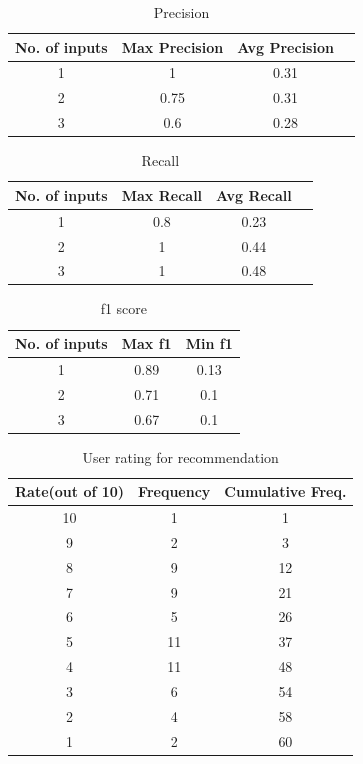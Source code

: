 \begin{table}
\centering
\caption{Precision}
\begin{tabular}{|c|c|c|c|}
\hline
No. of inputs & Max Precision & Avg Precision\\
\hline\hline
1 & 1 & 0.31\\
2 & 0.75 & 0.31\\
3 & 0.6 & 0.28\\
\hline\end{tabular}
\label{table:precision}
\end{table}

\begin{table}
\centering
\caption{Recall}
\begin{tabular}{|c|c|c|c|}
\hline
No. of inputs & Max Recall & Avg Recall\\
\hline\hline
1 & 0.8 & 0.23\\
2 & 1 & 0.44\\
3 & 1 & 0.48\\
\hline\end{tabular}
\label{table:recall}
\end{table}

\begin{table}
\centering
\caption{f1 score}
\begin{tabular}{|c|c|c|}
\hline
No. of inputs & Max f1 & Min f1\\
\hline\hline
1 & 0.89 & 0.13\\
2 & 0.71 & 0.1\\
3 & 0.67 & 0.1\\
\hline\end{tabular}
\label{table:f1}
\end{table}


\begin{table}
\centering
\caption{User rating for recommendation}
\begin{tabular}{|c|c|c|}
\hline
Rate(out of 10) & Frequency & Cumulative Freq.\\
\hline\hline
10 & 1 & 1\\
9 & 2 & 3\\
8 & 9 & 12\\
7 & 9 & 21\\
6 & 5 & 26\\
5 & 11 & 37\\
4 & 11 & 48\\
3 & 6 & 54\\
2 & 4 & 58\\
1 & 2 & 60\\
\hline\end{tabular}
\label{table:userRating}
\end{table}

